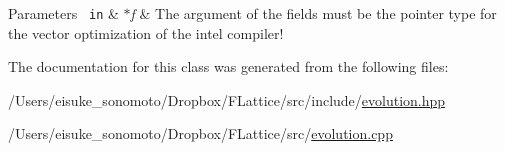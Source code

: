\begin{DoxyParams}[1]{Parameters}
\mbox{\texttt{ in}}  & {\em $\ast$f} & The argument of the fields must be the pointer type for the vector optimization of the intel compiler! \\
\hline
\end{DoxyParams}


The documentation for this class was generated from the following files\+:\begin{DoxyCompactItemize}
\item 
/\+Users/eisuke\+\_\+sonomoto/\+Dropbox/\+F\+Lattice/src/include/\mbox{\hyperlink{evolution_8hpp}{evolution.\+hpp}}\item 
/\+Users/eisuke\+\_\+sonomoto/\+Dropbox/\+F\+Lattice/src/\mbox{\hyperlink{evolution_8cpp}{evolution.\+cpp}}\end{DoxyCompactItemize}
